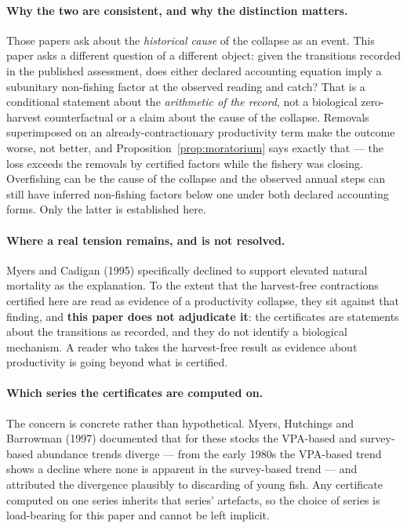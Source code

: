 \documentclass[10pt,twocolumn]{article}
\theoremstyle{plain}
\theoremstyle{remark}
\begin{document}
\paragraph{Why the two are consistent, and why the distinction matters.} Those papers ask
about the \emph{historical cause} of the collapse as an event. This paper asks a different
question of a different object: given the transitions recorded in the published assessment,
does either declared accounting equation imply a subunitary non-fishing
factor at the observed reading and catch? That is a conditional statement about the
\emph{arithmetic of the record}, not a biological zero-harvest counterfactual or a claim about the cause of the collapse. Removals superimposed
on an already-contractionary productivity term make the outcome worse, not better, and
Proposition~\ref{prop:moratorium} says exactly that --- the loss exceeds the removals by
certified factors while the fishery was closing. Overfishing can be the cause of the collapse
and the observed annual steps can still have inferred non-fishing factors below one under both declared accounting forms. Only the latter is established here.

\paragraph{Where a real tension remains, and is not resolved.} Myers and Cadigan (1995)
specifically declined to support elevated natural mortality as the explanation. To the extent
that the harvest-free contractions certified here are read as evidence of a productivity
collapse, they sit against that finding, and \textbf{this paper does not adjudicate it}: the
certificates are statements about the transitions as recorded, and they do not identify a
biological mechanism. A reader who takes the harvest-free result as evidence about
productivity is going beyond what is certified.

\paragraph{Which series the certificates are computed on.} The concern is concrete rather
than hypothetical. Myers, Hutchings and Barrowman (1997) documented that for these stocks the
VPA-based and survey-based abundance trends diverge --- from the early 1980s the VPA-based
trend shows a decline where none is apparent in the survey-based trend --- and attributed the
divergence plausibly to discarding of young fish. Any certificate computed on one series
inherits that series' artefacts, so the choice of series is load-bearing for this paper and
cannot be left implicit.
\end{document}
